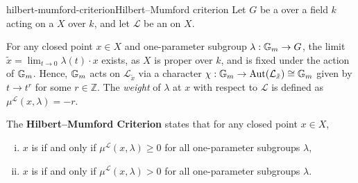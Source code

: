 \begin{topic}{hilbert-mumford-criterion}{Hilbert--Mumford criterion}
    Let $G$ be a  over a field $k$ acting on a  $X$  over $k$, and let $\mathcal{L}$ be an    on $X$.

    For any closed point $x \in X$ and one-parameter subgroup $\lambda : \mathbb{G}_m \to G$, the limit $\tilde{x} = \lim_{t \to 0} \lambda(t) \cdot x$ exists, as $X$ is proper over $k$, and is fixed under the action of $\mathbb{G}_m$. Hence, $\mathbb{G}_m$ acts on $\mathcal{L}_{\tilde{x}}$ via a character $\chi : \mathbb{G}_m \to \textup{Aut}(\mathcal{L}_{\tilde{x}}) \cong \mathbb{G}_m$ given by $t \to t^r$ for some $r \in \mathbb{Z}$. The \textit{weight} of $\lambda$ at $x$ with respect to $\mathcal{L}$ is defined as $\mu^\mathcal{L}(x, \lambda) = -r$.
    
    The \textbf{Hilbert--Mumford Criterion} states that for any closed point $x \in X$,
    \begin{enumerate}[(i)]
        \item $x$ is  if and only if $\mu^\mathcal{L}(x, \lambda) \ge 0$ for all one-parameter subgroups $\lambda$,
        \item $x$ is  if and only if $\mu^\mathcal{L}(x, \lambda) > 0$ for all one-parameter subgroups $\lambda$.
    \end{enumerate}
\end{topic}

